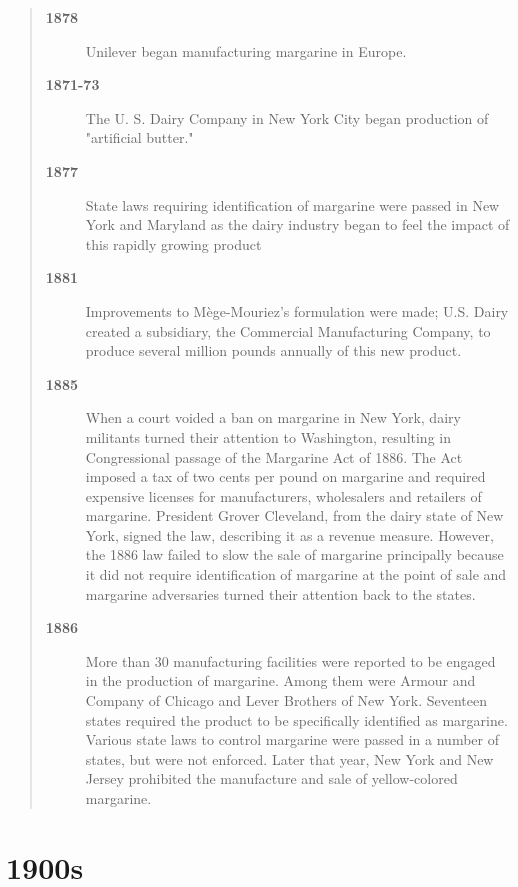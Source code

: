 \documentclass[stsc,blindrev]{informs-stsc}
\begin{document}
\begin{quotation}
\begin{description}
\item[\bf 1878] Unilever began manufacturing margarine in Europe.

\item[\bf 1871-73] The U. S. Dairy Company in New York City began
production of "artificial butter."

\item[\bf 1877] State laws requiring identification of margarine were
passed in New York and Maryland as the dairy industry began to feel
the impact of this rapidly growing product

\item[\bf 1881] Improvements to M\`ege-Mouriez's formulation were made;
U.S. Dairy created a subsidiary, the Commercial Manufacturing Company,
to produce several million pounds annually of this new product.

\item[\bf 1885] When a court voided a ban on margarine in New York,
dairy militants turned their attention to Washington, resulting in
Congressional passage of the Margarine Act of 1886. The Act imposed
a tax of two cents per pound on margarine and required expensive
licenses for manufacturers, wholesalers and retailers of margarine.
President Grover Cleveland, from the dairy state of New York, signed
the law, describing it as a revenue measure. However, the 1886 law
failed to slow the sale of margarine principally because it did not
require identification of margarine at the point of sale and
margarine adversaries turned their attention back to the states.

\item[\bf 1886] More than 30 manufacturing facilities were reported to
be engaged in the production of margarine. Among them were Armour
and Company of Chicago and Lever Brothers of New York. Seventeen
states required the product to be specifically identified as
margarine. Various state laws to control margarine were passed in a
number of states, but were not enforced. Later that year, New York
and New Jersey prohibited the manufacture and sale of yellow-colored
margarine.

\end{description}

\end{quotation}



\section{1900s}
\end{document}
